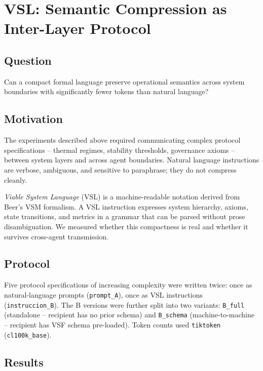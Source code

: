 \documentclass[11pt, a4paper]{article}
\begin{document}
\section{VSL: Semantic Compression as Inter-Layer Protocol}
\label{sec:vsl}

\subsection*{Question}
Can a compact formal language preserve operational semantics across system
boundaries with significantly fewer tokens than natural language?

\subsection{Motivation}

The experiments described above required communicating complex protocol
specifications -- thermal regimes, stability thresholds, governance axioms --
between system layers and across agent boundaries.
Natural language instructions are verbose, ambiguous, and sensitive to
paraphrase; they do not compress cleanly.

\emph{Viable System Language} (VSL) is a machine-readable notation derived
from Beer's VSM formalism.
A VSL instruction expresses system hierarchy, axioms, state transitions,
and metrics in a grammar that can be parsed without prose disambiguation.
We measured whether this compactness is real and whether it survives
cross-agent transmission.

\subsection{Protocol}

Five protocol specifications of increasing complexity were written twice:
once as natural-language prompts (\texttt{prompt\_A}), once as VSL
instructions (\texttt{instruccion\_B}).
The B versions were further split into two variants:
\texttt{B\_full} (standalone -- recipient has no prior schema)
and \texttt{B\_schema} (machine-to-machine -- recipient has VSF schema
pre-loaded).
Token counts used \texttt{tiktoken} (\texttt{cl100k\_base}).

\subsection{Results}
\end{document}
